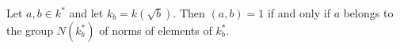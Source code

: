 Let $a, b \in k^*$ and let $k_b = k(\sqrt{b})$. Then $(a, b) = 1$ if and only if $a$ belongs to the group $N(k_b^*)$ of norms of elements of $k_b^*$.
